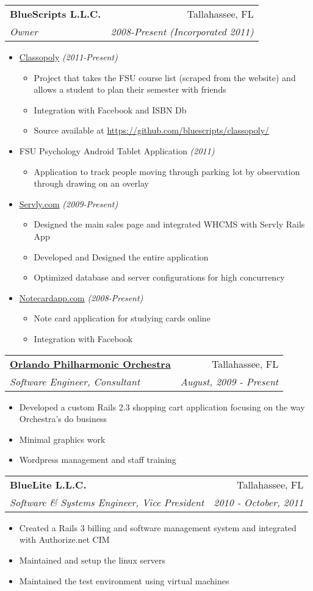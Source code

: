 \documentclass[letterpaper,11pt]{article}
\makeatletter
\newcommand{\resitem}[1]{\item #1 \vspace{-2pt}}
\newcommand{\ressubheading}[4]{
\begin{tabular*}{7.0in}{l@{\extracolsep{\fill}}r}
		\textbf{#1} & #2 \\
		\textit{#3} & \textit{#4} \\
\end{tabular*}\vspace{-6pt}}
\makeatother
\begin{document}
\ressubheading{BlueScripts L.L.C.}{Tallahassee, FL}{Owner}{2008-Present (Incorporated 2011)}
\begin{itemize}

        \resitem{\href{classopoly.com}{Classopoly} \textit{(2011-Present)}}
        \begin{itemize} 
                \resitem{Project that takes the FSU course list (scraped from the website) and allows a student to plan their semester with friends} 
                \resitem{Integration with Facebook and ISBN Db}
                \resitem{Source available at \url{https://github.com/bluescripts/classopoly/}}
        \end{itemize}

        \resitem{FSU Psychology Android Tablet Application \textit{(2011)}}
        \begin{itemize} 
                \resitem{Application to track people moving through parking lot by observation through drawing on an overlay}
        \end{itemize}

        \resitem{\url{Servly.com} \textit{(2009-Present)}}
        \begin{itemize} 
                \resitem{Designed the main sales page and integrated WHCMS with Servly Rails App}
                \resitem{Developed and Designed the entire application}
                \resitem{Optimized database and server configurations for high concurrency}
        \end{itemize}

        \resitem{\url{Notecardapp.com} \textit{(2008-Present)}}
        \begin{itemize}
                \resitem{Note card application for studying cards online}
                \resitem{Integration with Facebook}
        \end{itemize}
\end{itemize}


\ressubheading{\href{http://orlandophil.org/}{Orlando Philharmonic Orchestra}}{Tallahassee, FL}{Software Engineer, Consultant}{August, 2009 - Present}
\begin{itemize} 
        \resitem{Developed a custom Rails 2.3 shopping cart application focusing on the way Orchestra's do business}
        \resitem{Minimal graphics work}
        \resitem{Wordpress management and staff training}
\end{itemize}

\ressubheading{BlueLite L.L.C.}{Tallahassee, FL}{Software \& Systems Engineer, Vice President}{2010 - October, 2011}
\begin{itemize} 
        \resitem{Created a Rails 3 billing and software management system and integrated with Authorize.net CIM}
        \resitem{Maintained and setup the linux servers}
        \resitem{Maintained the test environment using virtual machines}
\end{itemize}
\end{document}
